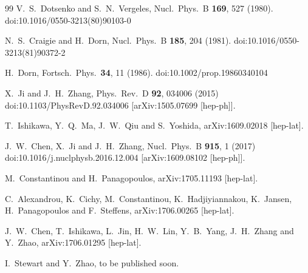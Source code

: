 \begin{thebibliography}{99}
  V.~S.~Dotsenko and S.~N.~Vergeles,
  Nucl.\ Phys.\ B {\bf 169}, 527 (1980).
  doi:10.1016/0550-3213(80)90103-0

  N.~S.~Craigie and H.~Dorn,
  Nucl.\ Phys.\ B {\bf 185}, 204 (1981).
  doi:10.1016/0550-3213(81)90372-2

  H.~Dorn,
  Fortsch.\ Phys.\  {\bf 34}, 11 (1986).
  doi:10.1002/prop.19860340104

  X.~Ji and J.~H.~Zhang,
  Phys.\ Rev.\ D {\bf 92}, 034006 (2015)
  doi:10.1103/PhysRevD.92.034006
  [arXiv:1505.07699 [hep-ph]].

  T.~Ishikawa, Y.~Q.~Ma, J.~W.~Qiu and S.~Yoshida,
  arXiv:1609.02018 [hep-lat].

  J.~W.~Chen, X.~Ji and J.~H.~Zhang,
  Nucl.\ Phys.\ B {\bf 915}, 1 (2017)
  doi:10.1016/j.nuclphysb.2016.12.004
  [arXiv:1609.08102 [hep-ph]].

  M.~Constantinou and H.~Panagopoulos,
  arXiv:1705.11193 [hep-lat].

  C.~Alexandrou, K.~Cichy, M.~Constantinou, K.~Hadjiyiannakou, K.~Jansen, H.~Panagopoulos and F.~Steffens,
  arXiv:1706.00265 [hep-lat].


J.~W.~Chen, T.~Ishikawa, L.~Jin, H.~W.~Lin, Y.~B.~Yang, J.~H.~Zhang and Y.~Zhao,
arXiv:1706.01295 [hep-lat].


	I.~Stewart and Y.~Zhao,
	to be published soon.



\end{thebibliography}
